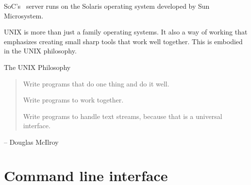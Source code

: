 SoC's \sunfire\ server runs on the Solaris operating system developed by Sun
Microsystem.  

UNIX is more than just a family operating systems. It also a way of working that
emphasizes creating small sharp tools that work well together. This is embodied
in the UNIX philosophy.   

\begin{frame}{The UNIX Philosophy}
\begin{quote}
Write programs that do one thing and do it well.

Write programs to work together.

Write programs to handle text streams, because that is a universal interface.
\end{quote}
\begin{flushright}
-- Douglas McIlroy
\end{flushright}
\end{frame}

\section{Command line interface} %

